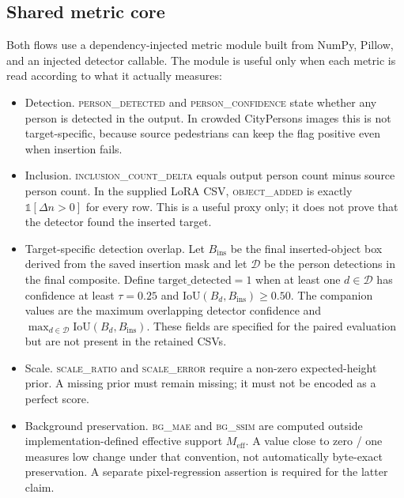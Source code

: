 \documentclass[11pt,a4paper]{article}
\newcommand{\bgmae}{\textsc{bg\_mae}\xspace}
\newcommand{\bgssim}{\textsc{bg\_ssim}\xspace}
\begin{document}
\subsection{Shared metric core}\label{sec:metrics}
Both flows use a dependency-injected metric module built from NumPy, Pillow, and
an injected detector callable. The module is useful only when each metric is read
according to what it actually measures:
\begin{itemize}[leftmargin=1.4em,itemsep=2pt]
  \item Detection. \textsc{person\_detected} and
        \textsc{person\_confidence} state whether any person is detected
        in the output. In crowded CityPersons images this is not target-specific,
        because source pedestrians can keep the flag positive even when insertion
        fails.
  \item Inclusion. \textsc{inclusion\_count\_delta} equals output person
        count minus source person count. In the supplied LoRA CSV,
        \textsc{object\_added} is exactly $\mathbb{1}[\Delta n>0]$ for every row.
        This is a useful proxy only; it does not prove that the detector found the inserted target.
  \item Target-specific detection overlap. Let $B_{\mathrm{ins}}$ be the final inserted-object
        box derived from the saved insertion mask and let $\mathcal{D}$ be the person detections
        in the final composite. Define $\mathrm{target\_detected}=1$ when at least one
        $d\in\mathcal{D}$ has confidence at least $\tau=0.25$ and
        $\mathrm{IoU}(B_d,B_{\mathrm{ins}})\ge0.50$. The companion values are the maximum
        overlapping detector confidence and $\max_{d\in\mathcal{D}}\mathrm{IoU}(B_d,B_{\mathrm{ins}})$.
        These fields are specified for the paired evaluation but are not present in the retained CSVs.
  \item Scale. \textsc{scale\_ratio} and \textsc{scale\_error} require
        a non-zero expected-height prior. A missing prior must remain missing; it
        must not be encoded as a perfect score.
  \item Background preservation. \bgmae and \bgssim are computed outside
        implementation-defined effective support $M_{\mathrm{eff}}$. A value close
        to zero / one measures low change under that convention, not automatically
        byte-exact preservation. A separate pixel-regression assertion is required
        for the latter claim.
\end{itemize}
\end{document}
